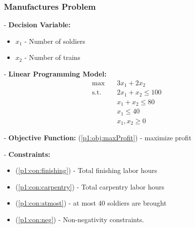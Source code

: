 \documentclass[10pt]{beamer}
\begin{document}
		\begin{frame}
			\frametitle{Manufactures Problem}
			- \textbf{Decision Variable:}
			\begin{itemize}
				\item $x_1$ - Number of soldiers
				\item $x_2$ - Number of trains
			\end{itemize}

			- \textbf{Linear Programming Model:}
			\begin{align}
				\max \quad & 3 x_1 + 2 x_2 \label{p1:obj:maxProfit}\\
				\text{s.t.} \quad & 2 x_1 + x_2 \le 100 \label{p1:con:finishing}\\
				& x_1 + x_2 \le 80 \label{p1:con:carpentry}\\
				& x_1 \le 40 \label{p1:con:atmost}\\
				& x_1, x_2 \ge 0 \label{p1:con:neg}
			\end{align}

			- \textbf{Objective Function: }
				(\ref{p1:obj:maxProfit}) - maximize profit

			- \textbf{Constraints:}
			\begin{itemize}
				\item (\ref{p1:con:finishing}) - Total finishing labor hours
				\item (\ref{p1:con:carpentry}) - Total carpentry labor hours
				\item (\ref{p1:con:atmost}) - at most 40 soldiers are brought
				\item (\ref{p1:con:neg}) - Non-negativity constraints.
			\end{itemize}
		\end{frame}
\end{document}
